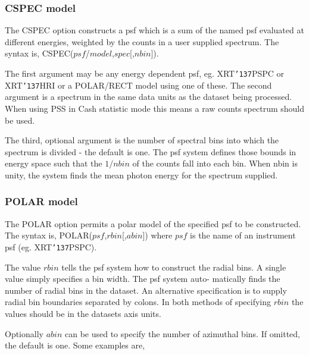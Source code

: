 \documentclass{book}
\renewcommand{\_}{{\tt\char'137}}     %
\begin{document}
\subsubsection{CSPEC model}
The CSPEC option constructs a psf which is a sum of the named
psf evaluated at different energies, weighted by the counts in
a user supplied spectrum. The syntax is, CSPEC($psf$/$model$,$spec$[,$nbin$]).
 
The first argument may be any energy dependent psf, eg. XRT\_PSPC
or XRT\_HRI or a POLAR/RECT model using one of these. The second
argument is a spectrum in the same data units as the dataset
being processed. When using PSS in Cash statistic mode this means
a raw counts spectrum should be used.
 
The third, optional argument is the number of spectral bins into
which the spectrum is divided - the default is one. The psf system
defines those bounds in energy space such that the $1/nbin$ of the
counts fall into each bin. When nbin is unity, the system finds
the mean photon energy for the spectrum supplied.
 
\subsubsection{POLAR model}
The POLAR option permits a polar model of the specified psf
to be constructed. The syntax is, POLAR($psf$,$rbin$[,$abin$])
where $psf$ is the name of an instrument psf (eg. XRT\_PSPC).
 
The value $rbin$ tells the psf system how to construct the radial bins. A
single value simply specifies a bin width. The psf system auto-
matically finds the number of radial bins in the dataset. An
alternative specification is to supply radial bin boundaries
separated by colons. In both methods of specifying $rbin$ the
values should be in the datasets axis units.
 
Optionally $abin$ can be used to specify the number of azimuthal
bins. If omitted, the default is one. Some examples are,
 
\end{document}
